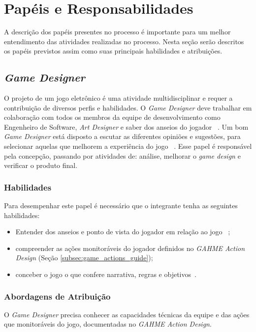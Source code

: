 \section{Papéis e Responsabilidades}
A descrição dos papéis presentes no processo é importante para um melhor entendimento das atividades realizadas no processo. Nesta seção serão descritos os papéis previstos assim como suas principais habilidades e atribuições.


\subsection{\textit{Game Designer}}\label{subsec:game_designer}
O projeto de um jogo eletrônico é uma atividade multidisciplinar e requer a contribuição de diversos perfis e habilidades. O \textit{Game Designer} deve trabalhar em colaboração com todos os membros da equipe de desenvolvimento como Engenheiro de Software, \textit{Art Designer} e saber dos anseios do jogador ~\cite{schell2008art}. Um bom \textit{Game Designer} está disposto a escutar as diferentes opiniões e sugestões, para selecionar aquelas que melhorem a experiência do jogo ~\cite{moore2011basics}. Esse papel é responsável pela concepção, passando por atividades de: análise, melhorar o \textit{game design} e verificar o produto final.

\subsubsection{Habilidades}
Para desempenhar este papel é necessário que o integrante tenha as seguintes habilidades:
  \begin{itemize}
	  \item Entender dos anseios e ponto de vista do jogador em relação ao jogo ~\cite{schell2008art};
		\item compreender as ações monitoráveis do jogador definidos no \textit{GAHME Action Design} (Seção \ref{subsec:game_actions_guide});
		\item conceber o jogo o que confere narrativa, regras e objetivos~\cite{schell2008art,moore2011basics,bethke2003game}.
  \end{itemize}

\subsubsection{Abordagens de Atribuição}
O \textit{Game Designer} precisa conhecer as capacidades técnicas da equipe e das ações que monitoráveis do jogo, documentadas no \textit{GAHME Action Design}.

